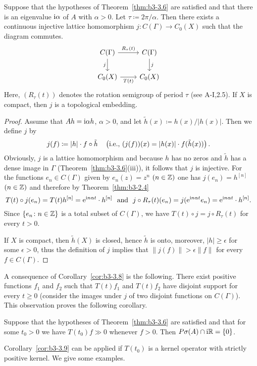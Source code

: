 \begin{corollary}\label{cor:b3-3.8}%
Suppose that the hypotheses of Theorem~\ref{thm:b3-3.6} are satisfied and that there is an eigenvalue $\mathrm{i} \alpha$ of $A$ with $\alpha > 0$.
Let $\tau \coloneq 2\pi/\alpha$.
Then there exists a continuous injective lattice homomorphism $j \colon C(\Gamma) \to C_{0}(X)$ such that the diagram commutes. 
\[
\begin{tikzcd}
C(\Gamma) \arrow[r, "R_{\tau}(t)"] \arrow[d, "j"'] & C(\Gamma) \arrow[d, "j"] \\
C_{0}(X) \arrow[r, "T(t)"'] & C_{0}(X)
\end{tikzcd}
\]
Here, $(R_{\tau}(t))$ denotes the rotation semigroup of period $\tau$ (see A-I,2.5).
If $X$ is compact, then $j$ is a topological embedding.
\end{corollary}
\begin{proof}
	Assume that $Ah = \mathrm{i}\alpha h$, $\alpha > 0$, and let $\tilde{h}(x) \coloneq h(x)/|h(x)|$.
	Then we define $j$ by
	\begin{equation}\label{eq:b3-3.9}
	j(f) \coloneq |h|\cdot f\circ\tilde{h} \quad \left(\text{\ie\ }(j(f))(x) = |h(x)|\cdot f(\tilde{h}(x))\right).
	\end{equation}
	Obviously, $j$ is a lattice homomorphism and because $h$ has no zeros and $\tilde{h}$ has a dense image in $\Gamma$ (Theorem~\ref{thm:b3-3.6}(iii)), it follows that $j$ is injective.
	For the functions $e_{n} \in C(\Gamma)$ given by $e_{n}(z) = z^{n}$ $(n \in \mathbb{Z})$ one has $j(e_{n}) = h^{[n]}$ $(n \in \mathbb{Z})$ and therefore by Theorem~\ref{thm:b3-2.4}
    \[ 
    T(t)\circ j(e_{n}) = T(t)h^{[n]} = \mathrm{e}^{\im n\alpha t}\cdot h^{[n]} 
    \ \text{ and } \ 
    j\circ R_{\tau}(t)(e_{n}) = j(\mathrm{e}^{\im n\alpha t}e_{n}) = \mathrm{e}^{\im n\alpha t}\cdot h^{[n]}.
    \]
    Since $\{e_{n} \colon n \in \mathbb{Z}\}$ is a total subset of $C(\Gamma)$, we have $T(t)\circ j = j\circ R_{\tau}(t)$ for every $t > 0$.
	
	If $X$ is compact, then $\tilde{h}(X)$ is closed, hence $\tilde{h}$ is onto, moreover, $|h| \geq \epsilon$ for some $\epsilon > 0$, thus the definition of $j$ implies that $\|j(f)\| > \epsilon\|f\|$ for every $f \in C(\Gamma)$.
\end{proof}
A consequence of Corollary~\ref{cor:b3-3.8} is the following. 
There exist positive functions $f_{1}$ and $f_{2}$ such that $T(t)f_{1}$ and $T(t)f_{2}$ have disjoint support for every $t \geq 0$ (consider the images under $j$ of two disjoint functions on $C(\Gamma)$).
This observation proves the following corollary.
\begin{corollary}\label{cor:b3-3.9}
	Suppose that the hypotheses of Theorem~\ref{thm:b3-3.6} are satisfied and that for some $t_{0} > 0$ we have $T(t_{0})f \gg 0$ whenever $f > 0$.
	Then $P\sigma(A)\cap \mathrm{i}\mathbb{R} = \{0\}$.
\end{corollary}
Corollary~\ref{cor:b3-3.9} can be applied if $T(t_{0})$ is a kernel operator with strictly positive kernel.
We give some examples.

